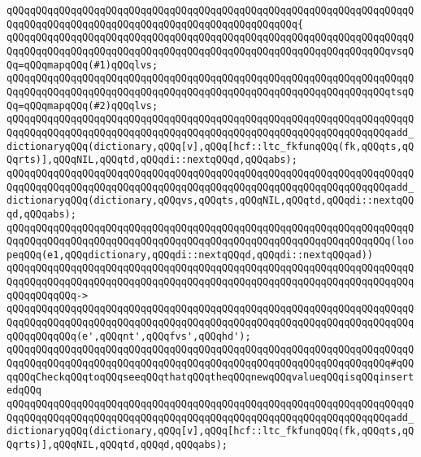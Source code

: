 \verb|qQQqqQQqqQQqqQQqqQQqqQQqqQQqqQQqqQQqqQQqqQQqqQQqqQQqqQQqqQQqqQQqqQQqqQQqqQQqqQQqqQQqqQQqqQQqqQQqqQQqqQQqqQQqqQQqqQQqqQQq{|\newline
\verb|qQQqqQQqqQQqqQQqqQQqqQQqqQQqqQQqqQQqqQQqqQQqqQQqqQQqqQQqqQQqqQQqqQQqqQQqqQQqqQQqqQQqqQQqqQQqqQQqqQQqqQQqqQQqqQQqqQQqqQQqqQQqqQQqqQQqqQQqvsqQQq=qQQqmapqQQq(#1)qQQqlvs;|\newline
\verb|qQQqqQQqqQQqqQQqqQQqqQQqqQQqqQQqqQQqqQQqqQQqqQQqqQQqqQQqqQQqqQQqqQQqqQQqqQQqqQQqqQQqqQQqqQQqqQQqqQQqqQQqqQQqqQQqqQQqqQQqqQQqqQQqqQQqqQQqtsqQQq=qQQqmapqQQq(#2)qQQqlvs;|\newline
\newline
\verb|qQQqqQQqqQQqqQQqqQQqqQQqqQQqqQQqqQQqqQQqqQQqqQQqqQQqqQQqqQQqqQQqqQQqqQQqqQQqqQQqqQQqqQQqqQQqqQQqqQQqqQQqqQQqqQQqqQQqqQQqqQQqqQQqqQQqqQQqadd_dictionaryqQQq(dictionary,qQQq[v],qQQq[hcf::ltc_fkfunqQQq(fk,qQQqts,qQQqrts)],qQQqNIL,qQQqtd,qQQqdi::nextqQQqd,qQQqabs);|\newline
\newline
\verb|qQQqqQQqqQQqqQQqqQQqqQQqqQQqqQQqqQQqqQQqqQQqqQQqqQQqqQQqqQQqqQQqqQQqqQQqqQQqqQQqqQQqqQQqqQQqqQQqqQQqqQQqqQQqqQQqqQQqqQQqqQQqqQQqqQQqqQQqadd_dictionaryqQQq(dictionary,qQQqvs,qQQqts,qQQqNIL,qQQqtd,qQQqdi::nextqQQqd,qQQqabs);|\newline
\newline
\verb|qQQqqQQqqQQqqQQqqQQqqQQqqQQqqQQqqQQqqQQqqQQqqQQqqQQqqQQqqQQqqQQqqQQqqQQqqQQqqQQqqQQqqQQqqQQqqQQqqQQqqQQqqQQqqQQqqQQqqQQqqQQqqQQqqQQqqQQq(loopeqQQq(e1,qQQqdictionary,qQQqdi::nextqQQqd,qQQqdi::nextqQQqad))|\newline
\verb|qQQqqQQqqQQqqQQqqQQqqQQqqQQqqQQqqQQqqQQqqQQqqQQqqQQqqQQqqQQqqQQqqQQqqQQqqQQqqQQqqQQqqQQqqQQqqQQqqQQqqQQqqQQqqQQqqQQqqQQqqQQqqQQqqQQqqQQqqQQqqQQqqQQqqQQq->|\newline
\verb|qQQqqQQqqQQqqQQqqQQqqQQqqQQqqQQqqQQqqQQqqQQqqQQqqQQqqQQqqQQqqQQqqQQqqQQqqQQqqQQqqQQqqQQqqQQqqQQqqQQqqQQqqQQqqQQqqQQqqQQqqQQqqQQqqQQqqQQqqQQqqQQqqQQqqQQq(e',qQQqnt',qQQqfvs',qQQqhd');|\newline
\newline
\verb|qQQqqQQqqQQqqQQqqQQqqQQqqQQqqQQqqQQqqQQqqQQqqQQqqQQqqQQqqQQqqQQqqQQqqQQqqQQqqQQqqQQqqQQqqQQqqQQqqQQqqQQqqQQqqQQqqQQqqQQqqQQqqQQqqQQqqQQq#qQQqqQQqCheckqQQqtoqQQqseeqQQqthatqQQqtheqQQqnewqQQqvalueqQQqisqQQqinsertedqQQq|\newline
\newline
\verb|qQQqqQQqqQQqqQQqqQQqqQQqqQQqqQQqqQQqqQQqqQQqqQQqqQQqqQQqqQQqqQQqqQQqqQQqqQQqqQQqqQQqqQQqqQQqqQQqqQQqqQQqqQQqqQQqqQQqqQQqqQQqqQQqqQQqqQQqadd_dictionaryqQQq(dictionary,qQQq[v],qQQq[hcf::ltc_fkfunqQQq(fk,qQQqts,qQQqrts)],qQQqNIL,qQQqtd,qQQqd,qQQqabs);|\newline
